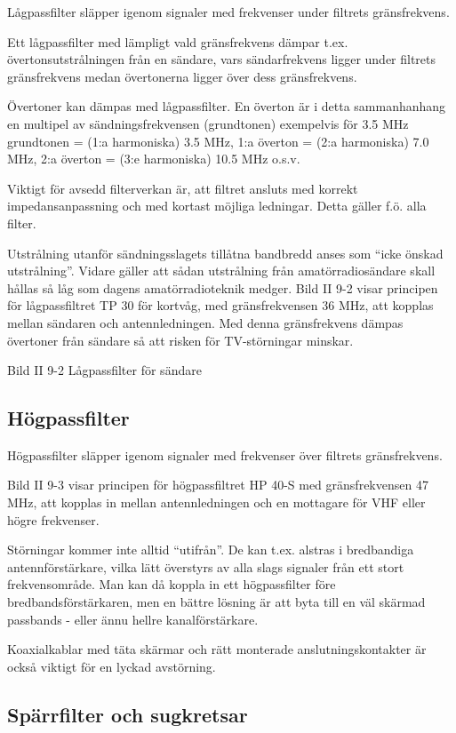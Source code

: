 Lågpassfilter släpper igenom signaler med frekvenser under filtrets
gränsfrekvens.

Ett lågpassfilter med lämpligt vald gränsfrekvens dämpar
t.ex. övertonsutstrålningen från en sändare, vars sändarfrekvens
ligger under filtrets gränsfrekvens medan övertonerna ligger över dess
gränsfrekvens.

Övertoner kan dämpas med lågpassfilter. En överton är i detta
sammanhanhang en multipel av sändningsfrekvensen (grundtonen)
exempelvis för 3.5 MHz grundtonen = (1:a harmoniska) 3.5 MHz, 1:a
överton = (2:a harmoniska) 7.0 MHz, 2:a överton = (3:e harmoniska)
10.5 MHz o.s.v.

Viktigt för avsedd filterverkan är, att filtret ansluts med korrekt
impedansanpassning och med kortast möjliga ledningar. Detta gäller
f.ö. alla filter.

Utstrålning utanför sändningsslagets tillåtna bandbredd anses som
``icke önskad utstrålning''. Vidare gäller att sådan utstrålning från
amatörradiosändare skall hållas så låg som dagens amatörradioteknik
medger.  Bild II 9-2 visar principen för lågpassfiltret TP 30 för
kortvåg, med gränsfrekvensen 36 MHz, att kopplas mellan sändaren och
antennledningen. Med denna gränsfrekvens dämpas övertoner från sändare
så att risken för TV-störningar minskar.

Bild II 9-2 Lågpassfilter för sändare

\subsection{Högpassfilter}

Högpassfilter släpper igenom signaler med frekvenser över filtrets
gränsfrekvens.

Bild II 9-3 visar principen för högpassfiltret HP 40-S med
gränsfrekvensen 47 MHz, att kopplas in mellan antennledningen och en
mottagare för VHF eller högre frekvenser.

Störningar kommer inte alltid ``utifrån''.  De kan t.ex. alstras i
bredbandiga antennförstärkare, vilka lätt överstyrs av alla slags
signaler från ett stort frekvensområde. Man kan då koppla in ett
högpassfilter före bredbandsförstärkaren, men en bättre lösning är att
byta till en väl skärmad passbands - eller ännu hellre
kanalförstärkare.

Koaxialkablar med täta skärmar och rätt monterade anslutningskontakter
är också viktigt för en lyckad avstörning.

\subsection{Spärrfilter och sugkretsar}

